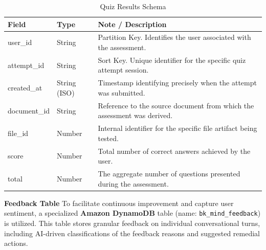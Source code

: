 \begin{table}[H]
    \centering
    \begin{tabular}{llp{8cm}}
        \toprule
        \textbf{Field} & \textbf{Type} & \textbf{Note / Description} \\
        \midrule
        user\_id & String & Partition Key. Identifies the user associated with the assessment. \\
        attempt\_id & String & Sort Key. Unique identifier for the specific quiz attempt session. \\
        \midrule
        created\_at & String (ISO) & Timestamp identifying precisely when the attempt was submitted. \\
        document\_id & String & Reference to the source document from which the assessment was derived. \\
        file\_id & Number & Internal identifier for the specific file artifact being tested. \\
        score & Number & Total number of correct answers achieved by the user. \\
        total & Number & The aggregate number of questions presented during the assessment. \\
        \bottomrule
    \end{tabular}
    \caption{Quiz Results Schema}
    \label{tab:quiz_results}
\end{table}

\newpage

\textbf{Feedback Table}
To facilitate continuous improvement and capture user sentiment, a specialized \textbf{Amazon DynamoDB} table (name: \texttt{bk\_mind\_feedback}) is utilized. This table stores granular feedback on individual conversational turns, including AI-driven classifications of the feedback reasons and suggested remedial actions.


